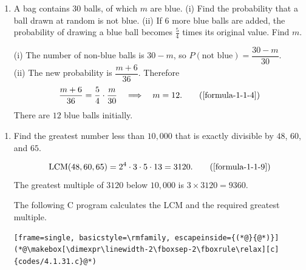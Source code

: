 \newpage
\begin{enumerate}[label={},leftmargin=1.15cm,labelwidth=1.0cm,labelsep=0.15cm,itemindent=0pt,listparindent=0pt,parsep=0pt,topsep=0pt]
\item[4.1.30] A bag contains 30 balls, of which $m$ are blue. (i) Find the probability that a ball drawn at random is not blue. (ii) If 6 more blue balls are added, the probability of drawing a blue ball becomes $\frac54$ times its original value. Find $m$.

\vspace{0.7em}\par\solution


(i) The number of non-blue balls is $30-m$, so $P(\text{not blue})=\dfrac{30-m}{30}$.\\
(ii) The new probability is $\dfrac{m+6}{36}$. Therefore
\begin{equation*}
\frac{m+6}{36}=\frac54\cdot\frac{m}{30}
\quad\Longrightarrow\quad m=12.
\tag*{(\ref{formula-1-1-4})}\end{equation*}
There are $12$ blue balls initially.
\end{enumerate}

\vspace{1.2em}
\begin{enumerate}[label={},leftmargin=1.15cm,labelwidth=1.0cm,labelsep=0.15cm,itemindent=0pt,listparindent=0pt,parsep=0pt,topsep=0pt]
\item[4.1.31] Find the greatest number less than $10{,}000$ that is exactly divisible by $48$, $60$, and $65$.

\vspace{0.7em}\par\solution


\begin{equation*}
\operatorname{LCM}(48,60,65)=2^4\cdot3\cdot5\cdot13=3120.
\tag*{(\ref{formula-1-1-9})}\end{equation*}
The greatest multiple of $3120$ below $10{,}000$ is $3\times3120=\boxed{9360}$.

The following C program calculates the LCM and the required greatest multiple.
\begin{lstlisting}[frame=single, basicstyle=\rmfamily, escapeinside={(*@}{@*)}]
(*@\makebox[\dimexpr\linewidth-2\fboxsep-2\fboxrule\relax][c]{codes/4.1.31.c}@*)
\end{lstlisting}
\end{enumerate}

